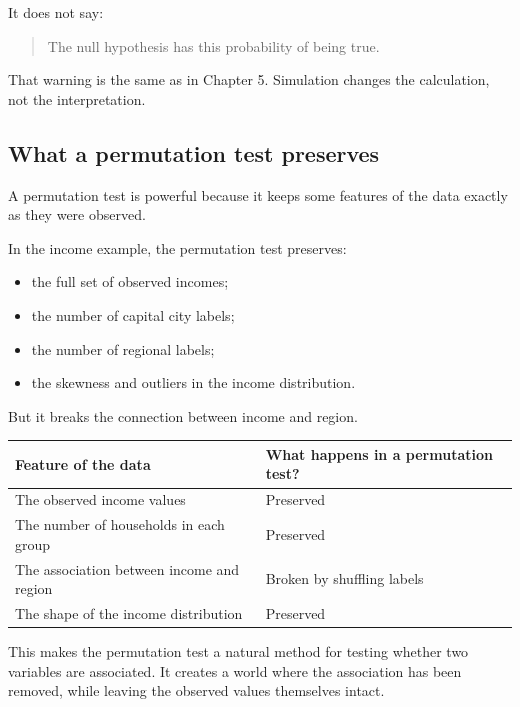 \documentclass[
  letterpaper,
  DIV=11,
  numbers=noendperiod]{scrreprt}
\providecommand{\tightlist}{%
  \setlength{\itemsep}{0pt}\setlength{\parskip}{0pt}}
\begin{document}
It does not say:

\begin{quote}
The null hypothesis has this probability of being true.
\end{quote}

That warning is the same as in Chapter 5. Simulation changes the
calculation, not the interpretation.

\subsection{What a permutation test
preserves}\label{what-a-permutation-test-preserves}

A permutation test is powerful because it keeps some features of the
data exactly as they were observed.

In the income example, the permutation test preserves:

\begin{itemize}
\tightlist
\item
  the full set of observed incomes;
\item
  the number of capital city labels;
\item
  the number of regional labels;
\item
  the skewness and outliers in the income distribution.
\end{itemize}

But it breaks the connection between income and region.

\begin{table}
\fontsize{12.0pt}{14.0pt}\selectfont
\begin{tabular*}{1\linewidth}{@{\extracolsep{\fill}}ll}
\toprule
Feature of the data & What happens in a permutation test? \\ 
\midrule\addlinespace[2.5pt]
The observed income values & Preserved \\ 
The number of households in each group & Preserved \\ 
The association between income and region & Broken by shuffling labels \\ 
The shape of the income distribution & Preserved \\ 
\bottomrule
\end{tabular*}
\end{table}

This makes the permutation test a natural method for testing whether two
variables are associated. It creates a world where the association has
been removed, while leaving the observed values themselves intact.
\end{document}
